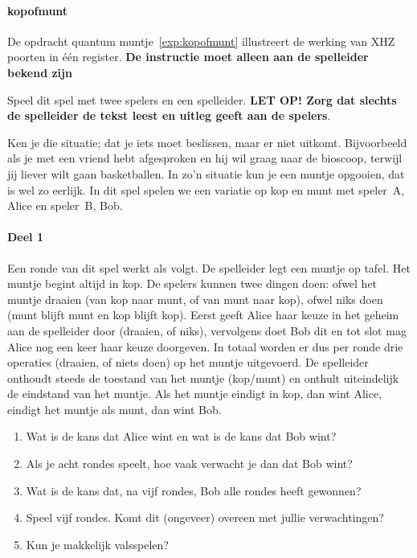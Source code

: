 \documentclass[../main.tex]{subfiles}
\begin{document}
\onlyinsubfile{
}
\notinsubfile{}
\paragraph*{kopofmunt\label{sec:kopofmunt}}
De opdracht quantum muntje~\ref{exp:kopofmunt} illustreert de werking van XHZ poorten in \'e\'en register. \textbf{De instructie moet alleen aan de spelleider bekend zijn}

Speel dit spel met twee spelers en een spelleider. \textbf{LET OP! Zorg dat slechts de spelleider de tekst leest en uitleg geeft aan de spelers}.

Ken je die situatie; dat je iets moet beslissen, maar er niet uitkomt. Bijvoorbeeld als je met een vriend hebt afgesproken en hij wil graag naar de bioscoop, terwijl jij liever wilt gaan basketballen. In zo'n situatie kun je een muntje opgooien, dat is wel zo eerlijk. In dit spel spelen we een variatie op kop en munt met speler~A, Alice en speler~B, Bob.

\paragraph*{Deel 1}
Een ronde van dit spel werkt als volgt. De spelleider legt een muntje op tafel. Het muntje begint altijd in kop. De spelers kunnen twee dingen doen: ofwel het muntje draaien (van kop naar munt, of van munt naar kop), ofwel niks doen (munt blijft munt en kop blijft kop). Eerst geeft Alice haar keuze in het geheim aan de spelleider door (draaien, of niks), vervolgens doet Bob dit en tot slot mag Alice nog een keer haar keuze doorgeven. In totaal worden er dus per ronde drie operaties (draaien, of niets doen) op het muntje uitgevoerd. De spelleider onthoudt steeds de toestand van het muntje (kop/munt) en onthult uiteindelijk de eindstand van het muntje. Als het muntje eindigt in kop, dan wint Alice, eindigt het muntje als munt, dan wint Bob.
\begin{enumerate}
\item Wat is de kans dat Alice wint en wat is de kans dat Bob wint?
\item Als je acht rondes speelt, hoe vaak verwacht je dan dat Bob wint?
\item Wat is de kans dat, na vijf rondes, Bob alle rondes heeft gewonnen?
\item Speel vijf rondes. Komt dit (ongeveer) overeen met jullie verwachtingen?
\item Kun je makkelijk valsspelen?
\end{enumerate}
\end{document}
